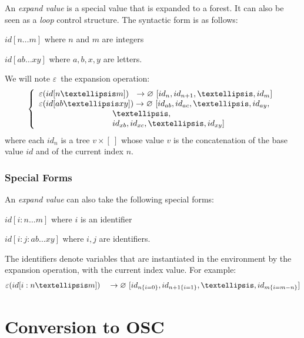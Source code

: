 \documentclass[runningheads]{llncs}
\newcommand{\forest}	{\ensuremath{\varnothing}}
\newcommand{\emptyf}	{\ensuremath{[\ ]}}
\newcommand{\nexpand}	{\ensuremath{\varepsilon}}
\newcommand{\ule}		{\hspace*{31.5mm}}
\begin{document}
An \emph{expand value} is a special value that is expanded to a forest. It can also be seen as a \emph{loop} control structure. The syntactic form is as follows:
\begin{description}
\item $id[n…m]$ 	where $n$ and $m$ are integers
\item $id[ab…xy]$ where $a,b,x,y$ are letters.
\end{description}
We will note \nexpand\ the expansion operation:
\[
\left\{
\begin{array}{l}
	\nexpand(id[n…m])   \ \ \to \forest \ [id_n,id_{n+1},…,id_m] \\
	\nexpand(id[ab…xy]) \to \forest \ [id_{ab},id_{ac},…,id_{ay}, \\
	\ule …,\\
	\ule id_{xb},id_{xc},…,id_{xy}]
\end{array}
\right.
\]
where each $id_n$ is a tree $v \times \emptyf$ whose value $v$ is the concatenation of the base value $id$ and of the current index $n$.

\subsubsection{Special Forms}

An \emph{expand value} can also take the following special forms: 
\begin{description}
\item $id[i:n…m]$ 	where $i$ is an identifier
\item $id[i:j:ab…xy]$ where $i,j$ are identifiers.
\end{description}
The identifiers denote variables that are instantiated in the environment by the expansion operation, with the current index value. For example:
\[
	\nexpand(id[i:n…m])   \quad \to \forest \ [id_{n\{i=0\}},id_{n+1\{i=1\}},…,id_{m\{i=m-n\}}] \\
\]

\section{Conversion to OSC}\label{sslash}
\end{document}
